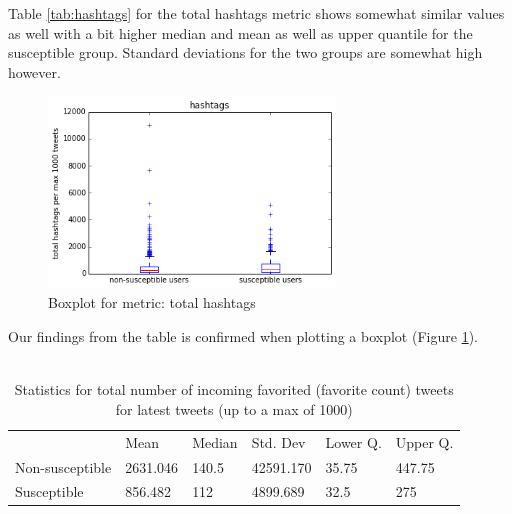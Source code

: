 \documentclass[10pt]{IEEEtran}
\begin{document}
Table \ref{tab:hashtags} for the total hashtags metric shows somewhat similar values as well with a bit higher median and mean as well as upper quantile for the susceptible group. Standard deviations for the two groups are somewhat high however.
\begin{figure}[H]
  \centering
  \includegraphics[width=3.0in]{total_hashtags_boxplot}
  \caption{Boxplot for metric: total hashtags}
  \label{fig:hashtags_boxplot}
\end{figure}
Our findings from the table is confirmed when plotting a boxplot (Figure \ref{fig:hashtags_boxplot}).\\\\

\begin{table}[ht!]
\begin{tabular}{llllll}
\textbf{}       & Mean     & Median & Std. Dev  & Lower Q. & Upper Q. \\
Non-susceptible & 2631.046 & 140.5  & 42591.170 & 35.75  & 447.75     \\
Susceptible     & 856.482  & 112    & 4899.689  & 32.5     &  275    
\end{tabular}
\caption{Statistics for total number of incoming favorited (favorite count) tweets for latest tweets (up to a max of 1000)}
\label{tab:favorite_count}
\end{table}
\end{document}
